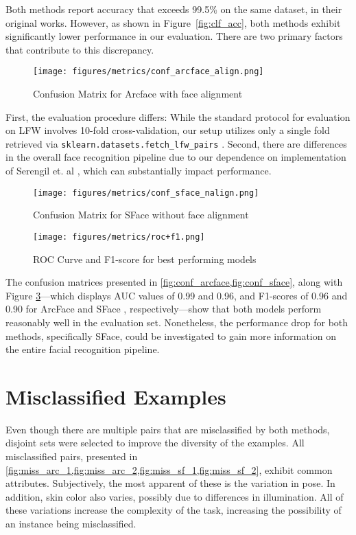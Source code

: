 \documentclass[10pt,a4paper,twoside]{article}
\begin{document}
Both methods \cite{arcface, sface} report accuracy that exceeds 99.5\% on the same dataset, in their original works. However, as shown in Figure~\ref{fig:clf_acc}, both methods exhibit significantly lower performance in our evaluation. There are two primary factors that contribute to this discrepancy. 

\begin{figure}[h]
    \centering
    \texttt{[image: figures/metrics/conf\_arcface\_align.png]} 
    \caption{Confusion Matrix for Arcface with face alignment}
    \label{fig:conf_arcface}
\end{figure}

First, the evaluation procedure differs: While the standard protocol for evaluation on LFW involves 10-fold cross-validation, our setup utilizes only a single fold retrieved via \texttt{sklearn.datasets.fetch\_lfw\_pairs} \cite{scikit-learn}. Second, there are differences in the overall face recognition pipeline due to our dependence on implementation of Serengil et. al \cite{deepface}, which can substantially impact performance.

\begin{figure}[h]
    \centering
    \texttt{[image: figures/metrics/conf\_sface\_nalign.png]} 
    \caption{Confusion Matrix for SFace without face alignment}
    \label{fig:conf_sface}
\end{figure}


\begin{figure}[h]
    \centering
    \texttt{[image: figures/metrics/roc+f1.png]} 
    \caption{ROC Curve and F1-score for best performing models}
    \label{fig:roc_f1}
\end{figure}


The confusion matrices presented in \cref{fig:conf_arcface,fig:conf_sface}, along with Figure \ref{fig:roc_f1}—which displays AUC values of 0.99 and 0.96, and F1-scores of 0.96 and 0.90 for ArcFace \cite{arcface} and SFace \cite{sface}, respectively—show that both models perform reasonably well in the evaluation set. Nonetheless, the performance drop for both methods, specifically SFace\cite{sface}, could be investigated to gain more information on the entire facial recognition pipeline.


\section{Misclassified Examples}
Even though there are multiple pairs that are misclassified by both methods, disjoint sets were selected to improve the diversity of the examples. All misclassified pairs, presented in \cref{fig:miss_arc_1,fig:miss_arc_2,fig:miss_sf_1,fig:miss_sf_2}, exhibit common attributes. Subjectively, the most apparent of these is the variation in pose. In addition, skin color also varies, possibly due to differences in illumination. All of these variations increase the complexity of the task, increasing the possibility of an instance being misclassified.
\end{document}
